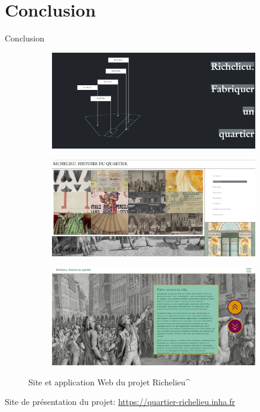 \documentclass[8pt]{beamer}
\begin{document}
\section*{Conclusion}
\begin{frame}{Conclusion}
	\begin{figure}
		\begin{subfigure}{0.5\textwidth}
			\includegraphics[width=\textwidth]{includes/conclu0.png}
		\end{subfigure}
		\begin{subfigure}{0.5\textwidth}
			\includegraphics[width=\textwidth]{includes/conclu1.png}
		\end{subfigure}
		\begin{subfigure}{0.5\textwidth}
			\includegraphics[width=\textwidth]{includes/app_2.png}
		\end{subfigure}
		\caption{Site et application Web du projet Richelieu^}
	\end{figure}
	\begin{center}
		Site de présentation du projet:
		\url{https://quartier-richelieu.inha.fr}
	\end{center}
\end{frame}
\end{document}
